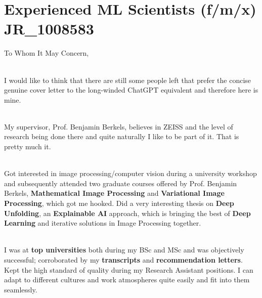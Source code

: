 \section{Experienced ML Scientists (f/m/x) JR\_1008583}
To Whom It May Concern,

\\
I would like to think that there are still some people left that prefer the concise genuine cover letter to the long-winded ChatGPT equivalent and therefore here is mine.

\\
My supervisor, Prof. Benjamin Berkels, believes in ZEISS and the level of research being done there and 
quite naturally I like to be part of it. That is pretty much it. 

\\
Got interested in image processing/computer vision during a university workshop and subsequently attended 
two graduate courses offered by Prof. Benjamin Berkels, \textbf{Mathematical Image Processing} and \textbf{Variational Image Processing}, which got me hooked.
Did a very interesting thesis on \textbf{Deep Unfolding}, an \textbf{Explainable AI} approach, which is bringing the best of \textbf{Deep Learning} and iterative solutions in Image Processing together.


\\
I was at \textbf{top universities} both during my BSc and MSc and was 
objectively successful; corroborated by my \textbf{transcripts} and 
\textbf{recommendation letters}. Kept the high standard of quality 
during my Research Assistant positions. I can adapt to different 
cultures and work atmospheres quite easily and fit into them seamlessly.
